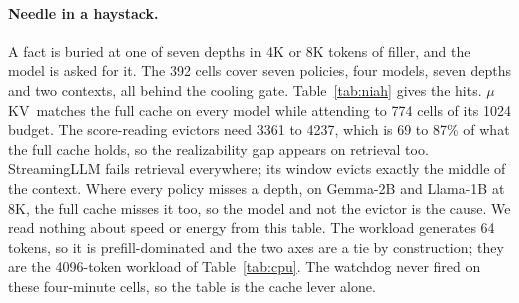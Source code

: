 \documentclass[sigconf, anonymous=false, screen=true]{acmart}
\newcommand{\muKV}{$\mu$KV}
\begin{document}
\paragraph{Needle in a haystack.} A fact is buried at one of seven depths in 4K or 8K tokens of filler, and the model is asked for it. The 392 cells cover seven policies, four models, seven depths and two contexts, all behind the cooling gate. Table~\ref{tab:niah} gives the hits. \muKV\ matches the full cache on every model while attending to 774 cells of its 1024 budget. The score-reading evictors need 3361 to 4237, which is 69 to 87\% of what the full cache holds, so the realizability gap appears on retrieval too. StreamingLLM fails retrieval everywhere; its window evicts exactly the middle of the context. Where every policy misses a depth, on Gemma-2B and Llama-1B at 8K, the full cache misses it too, so the model and not the evictor is the cause. We read nothing about speed or energy from this table. The workload generates 64 tokens, so it is prefill-dominated and the two axes are a tie by construction; they are the 4096-token workload of Table~\ref{tab:cpu}. The watchdog never fired on these four-minute cells, so the table is the cache lever alone.
\end{document}
